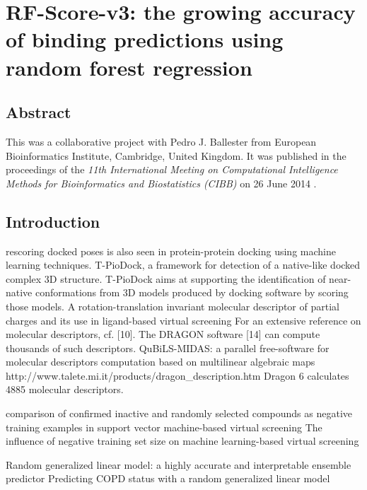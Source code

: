 \chapter{RF-Score-v3: the growing accuracy of binding predictions using random forest regression}

\section{Abstract}

This was a collaborative project with Pedro J. Ballester from European Bioinformatics Institute, Cambridge, United Kingdom. It was published in the proceedings of the \textit{11th International Meeting on Computational Intelligence Methods for Bioinformatics and Biostatistics (CIBB)} on 26 June 2014 \citep{1433}.


\section{Introduction}

\citep{1399} rescoring docked poses is also seen in protein-protein docking using machine learning techniques. T-PioDock, a framework for detection of a native-like docked complex 3D structure. T-PioDock aims at supporting the identification of near-native conformations from 3D models produced by docking software by scoring those models.
\citep{1389} A rotation-translation invariant molecular descriptor of partial charges and its use in ligand-based virtual screening
\citep{1389} For an extensive reference on molecular descriptors, cf. [10]. The DRAGON software [14] can compute thousands of such descriptors.
\citep{1400} QuBiLS-MIDAS: a parallel free-software for molecular descriptors computation based on multilinear algebraic maps
http://www.talete.mi.it/products/dragon\_description.htm Dragon 6 calculates 4885 molecular descriptors.

\citep{1423} comparison of confirmed inactive and randomly selected compounds as negative training examples in support vector machine-based virtual screening
\citep{1404} The influence of negative training set size on machine learning-based virtual screening

\citep{1377} Random generalized linear model: a highly accurate and interpretable ensemble predictor
\citep{1418} Predicting COPD status with a random generalized linear model

